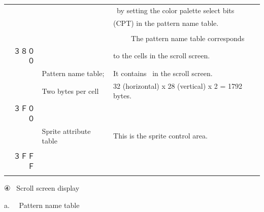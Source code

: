 \documentclass[a4paper,10pt]{article}
\begin{document}
\begin{tabular}{r|l|l}
& & \ by setting the color palette select bits\\[-1.2em]
& & (CPT) in the pattern name table.\\[-1.2em]
& &\\[-1.2em]
& & \ \ \ \ \ The pattern name table corresponds\\[-1.2em]
３８００ & & to the cells in the scroll screen.\\[-1.2em]
\cline{2-2}
& Pattern name table; & It contains \ in the scroll screen.\\[-1.2em]
& Two bytes per cell & 32 (horizontal) x 28 (vertical) x 2 = 1792 bytes.\\[-1.2em]
３Ｆ００ & &\\[-1.2em]
\cline{2-2}
& Sprite attribute table & This is the sprite control area.\\
\cline{2-2}
&\\[-3.6em]
３ＦＦＦ & \multicolumn{1}{l}{} &\\[-2.4em]
&\\[-1.2em]
\end{tabular}

\newpage

{}

\noindent ④ \ Scroll screen display

{}

\noindent a. \ \ Pattern name table
\end{document}
